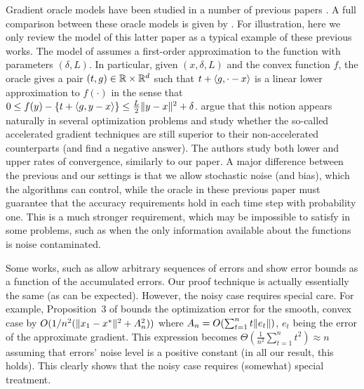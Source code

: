 Gradient oracle models have been studied in a number of previous papers 
\citep{dAsp08,Baes09,SchRoBa11,DeGliNe14}.
A full comparison between these oracle models is given by \citet{DeGliNe14}.
For illustration, here we only review the model of this latter paper as a typical example of these previous works.
The model of \citet{DeGliNe14} assumes a first-order approximation to the function
with parameters $(\delta,L)$. In particular, 
given $(x,\delta,L)$ and the convex function $f$, 
the oracle gives a pair $(t,g)\in \mathbb{R} \times \mathbb{R}^d$
such that $t + \langle g,\cdot-x \rangle$ is a linear lower approximation to $f(\cdot)$ in the sense that 
$0\le f(y) - \left\{ t+ \langle g,y-x \rangle\right\} \le \frac{L}{2} \|y-x\|^2 + \delta$.
\citet{DeGliNe14} argue that this notion appears naturally in several optimization problems and study whether the so-called accelerated gradient techniques are still superior to their non-accelerated counterparts (and find a negative answer).
The authors study both lower and upper rates of convergence, similarly to our paper.
A major difference between the previous and our settings is that we allow stochastic noise (and bias), which the algorithms can control, while the oracle in these previous paper must guarantee that the accuracy requirements hold in each time step
with probability one.
This is a much stronger requirement, which may be impossible to satisfy in some problems, such as when 
the only information available about the functions is noise contaminated.

Some works, such as \citet{SchRoBa11} allow arbitrary sequences of errors and show error bounds as a function
of the accumulated errors. 
Our proof technique is actually essentially the same (as can be expected).
However, the noisy case requires special care. For example, Proposition~3 of
\citet{SchRoBa11}  bounds the optimization error for the smooth, convex case by 
$O(1/n^2 ( \|x_1-x^*\|^2 + A_n^2 ))$ where $A_n = O( \sum_{t=1}^n t \|e_t\|)$, $e_t$ being the error of the approximate gradient. This expression becomes $\Theta(\frac{1}{n^2} \sum_{t=1}^n t^2)  \approx n$
assuming that errors' noise level is a positive constant (in all our result, this holds).
This clearly shows that the noisy case requires (somewhat) special treatment.

